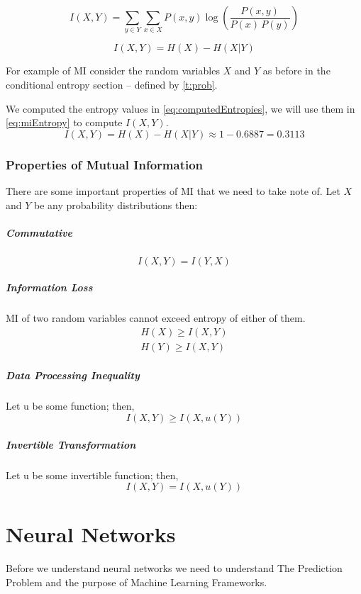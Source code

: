 \documentclass[dissertation.tex]{subfiles}
\begin{document}
\begin{equation}
      I(X,Y)=\sum _{y\in Y}\sum _{x\in X}{P(x,y)\log {\left({\frac
      {P(x,y)}{P(x)\,P(y)}}\right)}} 
\label{eq:miExplicit}
\end{equation}

\begin{equation}
  I(X, Y) = H(X) - H(X|Y)
\label{eq:miEntropy}
\end{equation}

For example of MI consider the random variables $X$ and $Y$ as
before in the conditional entropy section -- defined by \autoref{t:prob}. 

We computed the entropy values in \autoref{eq:computedEntropies}, we will use
them in \autoref{eq:miEntropy} to compute $I(X,Y)$.
\begin{equation}
  I(X,Y) = H(X) - H(X|Y) \approx 1 - 0.6887 = 0.3113
\end{equation}

\subsubsection{Properties of Mutual Information}
There are some important properties of MI that we need to take note of. Let $X$
and $Y$ be any probability distributions then:

\subparagraph{Commutative} 
\begin{equation}
  I(X,Y) = I(Y, X)
\end{equation}
\subparagraph{Information Loss} MI of two random variables cannot exceed entropy
of either of them.
\begin{align}
  H(X) \geq I(X,Y) \nonumber \\
  H(Y) \geq I(X,Y)
  \label{eq:MIloss}
\end{align}
\subparagraph{Data Processing Inequality} Let u be some function; then,
\begin{equation}
  I(X,Y) \geq I(X, u(Y))
\end{equation}
\subparagraph{Invertible Transformation} Let u be some invertible function;
then,
\begin{equation}
  I(X, Y) = I(X, u(Y))
\end{equation}

\section{Neural Networks}
\label{sec:NN}

Before we understand neural networks we need to understand The Prediction
Problem and the purpose of Machine Learning Frameworks.
\end{document}
